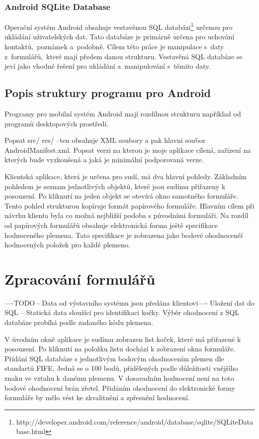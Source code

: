 \documentclass[11pt, oneside]{fithesis2}
\begin{document}
\subsection{Android SQLite Database}
Operační systém Android obsahuje vestavěnou SQL databázi\footnote {http://developer.android.com/reference/android/database/sqlite/SQLiteDatabase.html} určenou pro ukládání uživatelských dat.
Tato databáze je primárně určena pro uchování kontaktů,~poznámek a~podobně. Cílem této práce je manipulace s~daty z~formulářů,~které mají předem danou strukturu. Vestavěná SQL databáze se jeví jako vhodné řešení pro ukládání a~manipulování s~těmito daty.

\section{Popis struktury programu pro Android}
Programy pro mobilní systém Android mají rozdílnou strukturu například od programů desktopových prostředí.

Popsat src/ res/ --ten obsahuje XML soubory a pak hlavni soubor AndroidManifest.xml.
Popsat verzi na kterou je moje aplikace cílená, zařízení na kterých bude vyzkoušená a jaká je minimální podporovaná verze.

Klientská aplikace, která je určena pro sudí, má dva hlavní pohledy. Základním pohledem je seznam jednotlivých objektů, které jsou sudímu přiřazeny k posouzení. Po kliknutí na jeden objekt se otevírá okno samotného formuláře.
Tento pohled strukturou kopíruje formát papírového formuláře. Hlavním cílem při návrhu klienta byla co možná nejbližší podoba s původními formuláři. Na rozdíl od papírových formulářů obsahuje elektronická forma ještě specifikace
hodnoceného plemena. Tato specifikace je zobrazena jako bodové ohodnocenéí hodnocených položek pro každé plemeno.

\chapter{Zpracování formulářů}
----TODO - Data od výstavního systému jsou předána klientovi----
Uložení dat do SQL -- Statická data sloužící pro identifikaci kočky. Výběr ohodnocení z SQL databáze probíhá podle zadaného kódu plemena.
\linebreak

V úvodním okně aplikace je sudímu zobrazen list koček, které má přiřazené k posouzení. Po kliknutí na položku listu dochází k zobrazení okna formuláře.
Přídání SQL databáze s jednotlivým bodovým ohodnocením plemen dle standartů FIFE. Jedná se o 100 bodů, přidělených podle důležitosti vnějšího znaku ve vztahu k danému plemenu. V dosavadním hodnocení není na toto bodové ohodnocení
brán zřetel. Přidáním ohodnocení do elektronické formy formuláře by mělo vést ke zkvalitnění a zpřesnění hodnocení.
\end{document}
